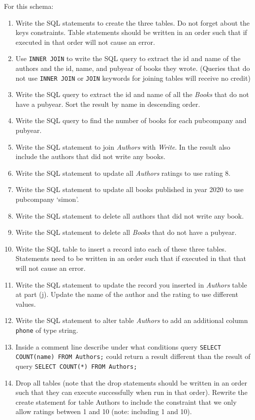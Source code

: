 \documentclass[letterpaper, 11pt]{article}
\begin{document}
For this schema:
\begin{enumerate}[label={\alph*}),leftmargin=*]
    \item Write the SQL statements to create the three tables. Do not forget about the keys constraints. Table statements should be written in an order such that if executed in that order will not cause an error. 
    \item Use \texttt{INNER JOIN} to write the SQL query to extract the id and name of the authors and the id, name, and pubyear of books they wrote. (Queries that do not use \texttt{INNER JOIN} or \texttt{JOIN} keywords for joining tables will receive no credit)
    \item Write the SQL query to extract the id and name of all the \textit{Books} that do not have a pubyear. Sort the result by name in descending order.
    \item Write the SQL query to find the number of books for each pubcompany and pubyear.
    \item Write the SQL statement to join \textit{Authors} with \textit{Write}. In the result also include the authors that did not write any books.
    \item Write the SQL statement to update all \textit{Authors} ratings to use rating 8.
    \item Write the SQL statement to update all books published in year 2020 to use {pubcompany} `simon'.
    \item Write the SQL statement to delete all authors that did not write any book.
    \item Write the SQL statement to delete all \textit{Books} that do not have a pubyear.
    \item Write the SQL table to insert a record into each of these three tables. Statements need to be written in an order such that if executed in that that will not cause an error.
    \item Write the SQL statement to update the record you inserted in \textit{Authors} table at part (j). Update the name of the author and the rating to use different values.
    \item Write the SQL statement to alter table \textit{Authors} to add an additional column \texttt{phone} of type string.
    \item Inside a comment line describe under what conditions query \texttt{SELECT COUNT(name) FROM Authors;} could return a result different than the result of query \texttt{SELECT COUNT(*) FROM Authors;}
    \item Drop all tables (note that the drop statements should be written in an order such that they can execute successfully when run in that order). Rewrite the create statement for table Authors to include the constraint that we only allow ratings between 1 and 10 (note: including 1 and 10). 
\end{enumerate}
\end{document}
